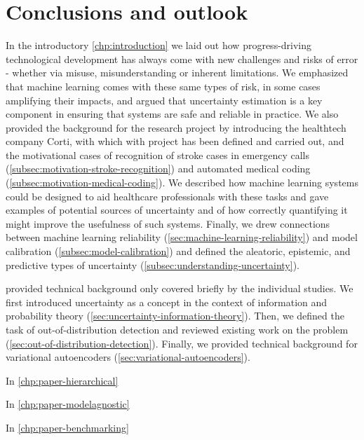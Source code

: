 
\chapter[conclusions and outlook]{Conclusions and outlook}\label{chp:conclusion}

In the introductory \cref{chp:introduction} we laid out how progress-driving technological development has always come with new challenges and risks of error - whether via misuse, misunderstanding or inherent limitations. We emphasized that machine learning comes with these same types of risk, in some cases amplifying their impacts, and argued that uncertainty estimation is a key component in ensuring that systems are safe and reliable in practice. We also provided the background for the research project by introducing the healthtech company Corti, with which with project has been defined and carried out, and the motivational cases of recognition of stroke cases in emergency calls (\cref{subsec:motivation-stroke-recognition}) and automated medical coding (\cref{subsec:motivation-medical-coding}). We described how machine learning systems could be designed to aid healthcare professionals with these tasks and gave examples of potential sources of uncertainty and of how correctly quantifying it might improve the usefulness of such systems. Finally, we drew connections between machine learning reliability (\cref{sec:machine-learning-reliability}) and model calibration (\cref{subsec:model-calibration}) and defined the aleatoric, epistemic, and predictive types of uncertainty (\cref{subsec:understanding-uncertainty}).


 provided technical background only covered briefly by the individual studies. We first introduced uncertainty as a concept in the context of information and probability theory (\cref{sec:uncertainty-information-theory}). Then, we defined the task of out-of-distribution detection and reviewed existing work on the problem (\cref{sec:out-of-distribution-detection}). Finally, we provided technical background for variational autoencoders (\cref{sec:variational-autoencoders}).


In \cref{chp:paper-hierarchical} 

In \cref{chp:paper-modelagnostic} 

In \cref{chp:paper-benchmarking} 

